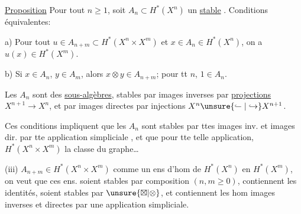 \uline{Proposition} Pour tout $n\geq1$, soit $A_n\subset H^*(X^n)$ un  \uline{stable} .
Conditions équivalentes:

 a) Pour tout  $u\in A_{n+m}\subset H^*(X^n\times X^m)$ et $x\in A_n\in H^*(X^n)$, on a $u(x)\in H^*(X^m)$.

b) Si $x\in A_n$, $y\in A_m$, alors $x\otimes y\in A_{n+m}$; pour tt $n$, $1\in A_n$.


 Les  $A_n$ sont des \uline{sous-algèbres}, stables par images inverses  par \uline{projections} $X^{n+1}\longrightarrow X^n$, et  par images directes par injections $X^n\unsure{\lhook\joinrel\relbar|\hookrightarrow}X^{n+1}$.


Ces conditions impliquent que les $A_n$ sont stables par ttes images inv. et images dir. par tte application simpliciale , et que  pour tte telle application, $H^*(X^n\times X^m)$  la classe du graphe\ldots

(iii)  $A_{n+m}\in H^*(X^n\times X^m)$ comme un ens d'hom de $H^*(X^n)$ en $H^*(X^m)$, on veut que ces ens. soient stables par composition $(n,m\geq0)$, contiennent les identités, soient stables par $\unsure{\boxtimes|\otimes}$, et contiennent les hom images inverses et directes par une application simpliciale.
